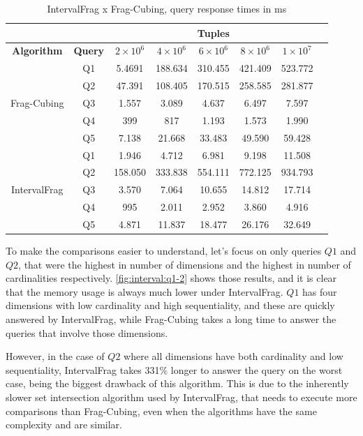 \begin{table}[!ht]
  \centering
  \caption{IntervalFrag x Frag-Cubing, query response times in ms}\label{tab:interval_query}
  \begin{tabular}{|c|c|c|c|c|c|c|c|}
    \hline
    & & \multicolumn{5}{c|}{\textbf{Tuples}} \\
    \hline
    \bfseries Algorithm & \bfseries Query & \bfseries $2\times10^6$ & \bfseries $4\times10^6$ & \bfseries $6\times10^6$ & \bfseries $8\times10^6$ & \bfseries $1\times10^7$\\
    \hline
    \multirow{5}{*}{Frag-Cubing} & Q1 &
    5.4691 & 188.634 & 310.455 & 421.409 & 523.772
    \\\cline{2-7} & Q2 &
    47.391 & 108.405 & 170.515 & 258.585 & 281.877
    \\\cline{2-7} & Q3 &
    1.557 & 3.089 & 4.637 & 6.497 & 7.597
    \\\cline{2-7} & Q4 &
    399 & 817 & 1.193 & 1.573 & 1.990
    \\\cline{2-7} & Q5 &
    7.138 & 21.668 & 33.483 & 49.590 & 59.428
    \\\hline
    \multirow{5}{*}{IntervalFrag} & Q1 &
    1.946 & 4.712 & 6.981 & 9.198 & 11.508
    \\\cline{2-7}
    & Q2 &
    158.050 & 333.838 & 554.111 & 772.125 & 934.793
    \\\cline{2-7} & Q3 &
    3.570 & 7.064 & 10.655 & 14.812 & 17.714
    \\\cline{2-7}
    & Q4 &
    995 & 2.011 & 2.952 & 3.860 & 4.916
    \\\cline{2-7}
    & Q5 &
    4.871 & 11.837 & 18.477 & 26.176 & 32.649
    \\\hline
  \end{tabular}
\end{table}

To make the comparisons easier to understand, let's focus on only queries $Q1$ and $Q2$, that were the highest in number of dimensions and the highest in number of cardinalities respectively.
\autoref{fig:interval:q1-2} shows those results, and it is clear that the memory usage is always much lower under IntervalFrag.
$Q1$ has four dimensions with low cardinality and high sequentiality, and these are quickly answered by IntervalFrag, while Frag-Cubing takes a long time to answer the queries that involve those dimensions.

However, in the case of $Q2$ where all dimensions have both cardinality and low sequentiality, IntervalFrag takes 331\% longer to answer the query on the worst case, being the biggest drawback of this algorithm.
This is due to the inherently slower set intersection algorithm used by IntervalFrag, that needs to execute more comparisons than Frag-Cubing, even when the algorithms have the same complexity and are similar.

